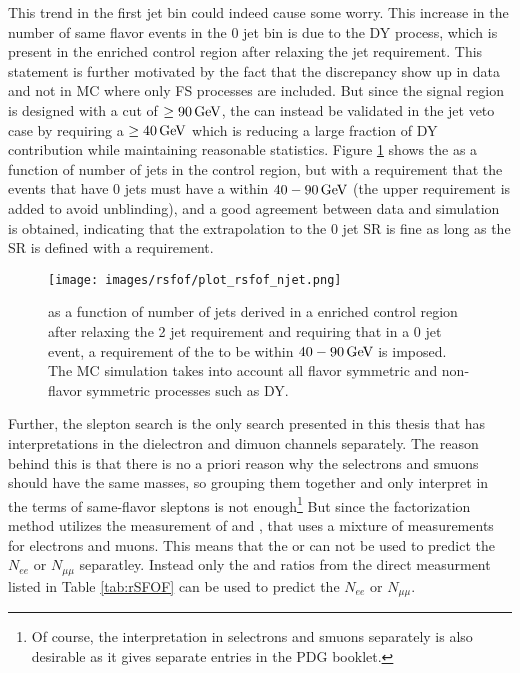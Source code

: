 This trend in the first jet bin could indeed cause some worry.
This increase in the number of same flavor events in the 0 jet bin is due to the DY process, which is present in the \ttbar enriched control region after relaxing the jet requirement.
This statement is further motivated by the fact that the discrepancy show up in data and not in MC where only FS processes are included.
But since the signal region is designed with a cut of \mttwo$\geq90\,\text{Ge\hspace{-.08em}V}$, the \Rsfof can instead be validated in the jet veto case by requiring a \mttwo$\geq40\,\text{Ge\hspace{-.08em}V}$ which is reducing a large fraction of DY contribution while maintaining reasonable statistics.
Figure \ref{fig:rsfofSleptonTwo} shows the \Rsfof as a function of number of jets in the \ttbar control region, but with a requirement that the events that have 0 jets must have a \mttwo within $40-90\,\text{Ge\hspace{-.08em}V}$ (the upper requirement is added to avoid unblinding), and a good agreement between data and simulation is obtained, indicating that the extrapolation to the 0 jet SR is fine as long as the SR is defined with a \mttwo requirement.
\begin{figure}[htbp!]
\begin{center}
    \texttt{[image: images/rsfof/plot\_rsfof\_njet.png]}
\caption{\Rsfof as a function of number of jets derived in a \ttbar enriched control region after relaxing the 2 jet requirement and requiring that in a 0 jet event, a requirement of the \mttwo to be     within $40-90\,\text{Ge\hspace{-.08em}V}$ is imposed. The MC simulation takes into account all flavor symmetric and non-flavor symmetric processes such as DY.}
\label{fig:rsfofSleptonTwo}
\end{center}
\end{figure}
Further, the slepton search is the only search presented in this thesis that has interpretations in the dielectron and dimuon channels separately.
The reason behind this is that there is no a priori reason why the selectrons and smuons should have the same masses, so grouping them together and only interpret in the terms of same-flavor sleptons     is not enough\footnote{Of course, the interpretation in selectrons and smuons separately is also desirable as it gives separate entries in the PDG booklet. }
But since the factorization method utilizes the measurement of \rmue and \RT, that uses a mixture of measurements for electrons and muons.
This means that the \rmue or \RT can not be used to predict the $N_{ee}$ or $N_{\mu\mu}$ separatley.
Instead only the \Reeof and \Rmmof ratios from the direct measurment listed in Table \ref{tab:rSFOF} can be used to predict the $N_{ee}$ or $N_{\mu\mu}$.
